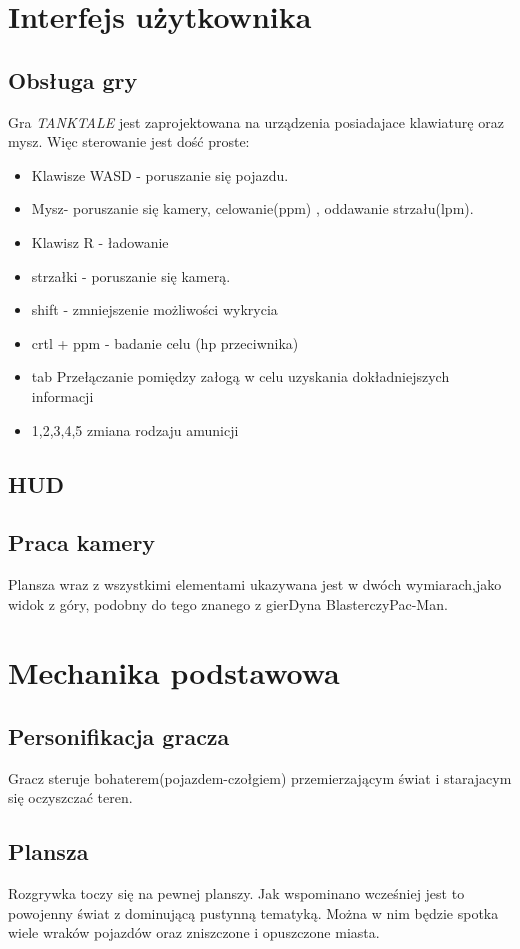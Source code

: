 \documentclass{article}
\begin{document}
\section{Interfejs użytkownika}
    \subsection{Obsługa gry}
Gra \emph{TANKTALE} jest zaprojektowana na urządzenia posiadajace klawiaturę oraz mysz. Więc sterowanie jest dość proste:
\begin{itemize}
    \item Klawisze WASD - poruszanie się pojazdu.
    \item Mysz- poruszanie się kamery, celowanie(ppm) , oddawanie strzału(lpm).
    \item Klawisz R - ładowanie
    \item strzałki - poruszanie się kamerą.
    \item shift - zmniejszenie możliwości wykrycia
    \item crtl + ppm - badanie celu (hp przeciwnika)
    \item tab Przełączanie pomiędzy załogą w celu uzyskania dokładniejszych informacji
    \item 1,2,3,4,5 zmiana rodzaju amunicji
    
\end{itemize}
    \subsection{HUD}
    \subsection{Praca kamery}
    Plansza  wraz  z  wszystkimi  elementami  ukazywana  jest  w  dwóch  wymiarach,jako  widok  z  góry,  podobny  do  tego  znanego  z  gierDyna  BlasterczyPac-Man.
    \newpage
    
\section{Mechanika podstawowa}
    \subsection{Personifikacja gracza}
    Gracz steruje bohaterem(pojazdem-czołgiem) przemierzającym świat i starajacym się oczyszczać teren.
    \subsection{Plansza}
    Rozgrywka toczy się na pewnej planszy. Jak wspominano wcześniej jest to powojenny świat z dominującą pustynną tematyką. Można w nim będzie spotka wiele wraków pojazdów oraz zniszczone i opuszczone miasta.
\end{document}
